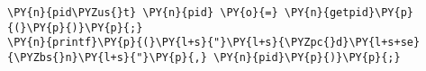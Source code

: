 \begin{Verbatim}[commandchars=\\\{\}]
\PY{n}{pid\PYZus{}t} \PY{n}{pid} \PY{o}{=} \PY{n}{getpid}\PY{p}{(}\PY{p}{)}\PY{p}{;}
\PY{n}{printf}\PY{p}{(}\PY{l+s}{"}\PY{l+s}{\PYZpc{}d}\PY{l+s+se}{\PYZbs{}n}\PY{l+s}{"}\PY{p}{,} \PY{n}{pid}\PY{p}{)}\PY{p}{;}
\end{Verbatim}
